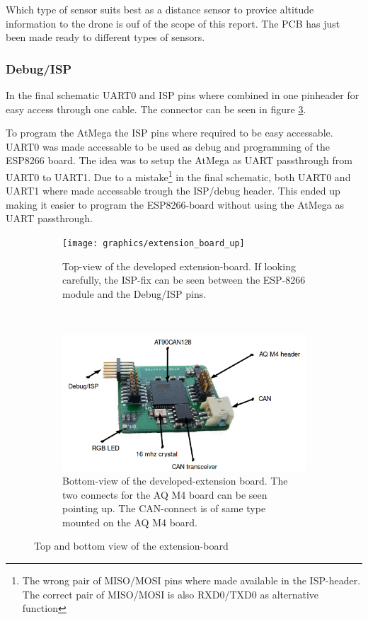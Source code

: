 Which type of sensor suits best as a distance sensor to provice altitude information to the drone is ouf of the scope of this report. The PCB has just been made ready to different types of sensors.

\subsubsection*{Debug/ISP}
In the final schematic UART0 and ISP pins where combined in one pinheader for easy access through one cable. 
The connector can be seen in figure \ref{fig:extension_board}.

To program the AtMega the ISP pins where required to be easy accessable. 
UART0 was made accessable to be used as debug and programming of the ESP8266 board.
The idea was to setup the AtMega as UART passthrough from UART0 to UART1.
Due to a mistake\footnote{The wrong pair of MISO/MOSI pins where made available in the ISP-header. The correct pair of MISO/MOSI is also RXD0/TXD0 as alternative function} in the final schematic, both UART0 and UART1 where made accessable trough the ISP/debug header. 
This ended up making it easier to program the ESP8266-board without using the AtMega as UART passthrough.

\begin{figure}[H]
    \centering
    \begin{subfigure}[b]{0.45\textwidth}
        \texttt{[image: graphics/extension\_board\_up]}
        \caption{Top-view of the developed extension-board. If looking carefully, the ISP-fix can be seen between the ESP-8266 module and the Debug/ISP pins.}
        \label{fig:extension_board_up}
    \end{subfigure}
    ~ 
    \begin{subfigure}[b]{0.51\textwidth}
        \includegraphics[width=\textwidth]{graphics/extension_board_down}
        \caption{Bottom-view of the developed-extension board. The two connects for the AQ M4 board can be seen pointing up. The CAN-connect is of same type mounted on the AQ M4 board.}
        \label{fig:extension_board_down}
    \end{subfigure}
    \caption{Top and bottom view of the extension-board}\label{fig:extension_board}
\end{figure}


